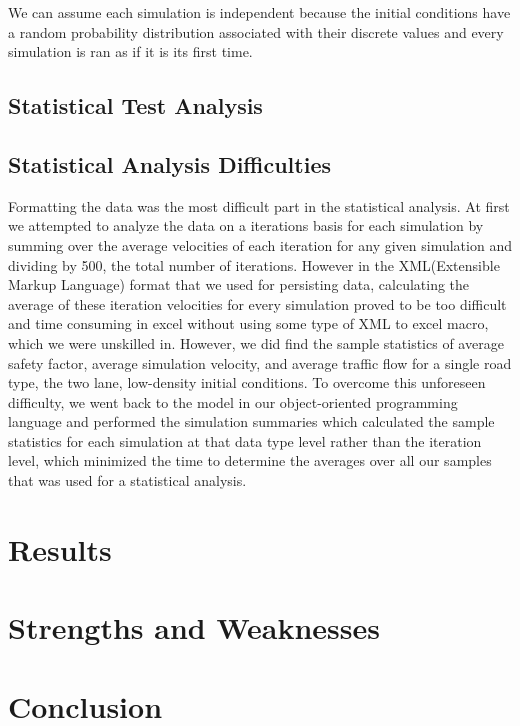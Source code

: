 \documentclass{amsart}
\begin{document}
		We can assume each simulation is independent because the initial conditions have a random probability distribution associated with their discrete values and every simulation is ran as if it is its first time. 
	
	
		
	\subsection{Statistical Test Analysis}

	\subsection{Statistical Analysis Difficulties}
	Formatting the data  was the most difficult part in the statistical analysis. At first we attempted to analyze the data on a iterations basis for each simulation by summing over the average velocities of each iteration for any given simulation and dividing by 500, the total number of iterations. However in the XML(Extensible Markup Language) format that we used for persisting data, calculating the average of these iteration velocities for every simulation proved to be too difficult and time consuming in excel without using some type of XML to excel macro, which we were unskilled in. However, we did find the sample statistics of average safety factor, average simulation velocity, and average traffic flow for a single road type, the two lane, low-density initial conditions. To overcome this unforeseen difficulty, we went back to the model in our object-oriented programming language and performed the simulation summaries which calculated the sample statistics for each simulation at that data type level rather than the iteration level, which minimized the time to determine the averages over all our samples that was used for a statistical analysis.

\section{\bfseries{Results}}

\section{\bfseries{Strengths and Weaknesses}}
	
\section{\bfseries{Conclusion}}
\end{document}
